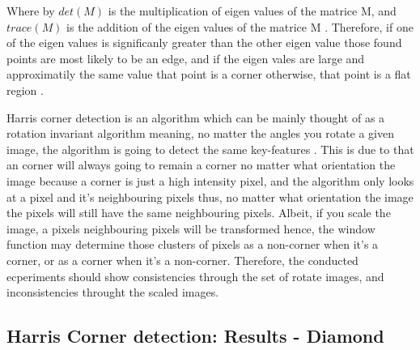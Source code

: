 \documentclass[conference]{IEEEtran}
\begin{document}
Where by $det(M)$ is the multiplication of eigen values of the matrice M, and $trace(M)$ is the addition of the eigen values of the matrice M \cite{b2}. Therefore, if one of the eigen values is significanly greater than the other eigen value those found points are most likely to be an edge, and if the eigen vales are large and approximatily the same value that point is a corner otherwise, that point is a flat region \cite{b2}.\par

Harris corner detection is an algorithm which can be mainly thought of as a rotation invariant algorithm meaning, no matter the angles you rotate a given image, the algorithm is going to detect the same key-features \cite{b2} \cite{b4}. This is due to that an corner will always going to remain a corner no matter what orientation the image because a corner is just a high intensity pixel, and the algorithm only looks at a pixel and it's neighbouring pixels thus, no matter what orientation the image the pixels will still have the same neighbouring pixels\cite{b2}. Albeit, if you scale the image, a pixels neighbouring pixels will be transformed hence, the window function may determine those clusters of pixels as a non-corner when it's a corner, or as a corner when it's a non-corner. Therefore, the conducted ecperiments should show consistencies through the set of rotate images, and inconsistencies throught the scaled images.

\newpage
\clearpage
\subsection{Harris Corner detection: Results - Diamond}\label{one-results}
\end{document}

